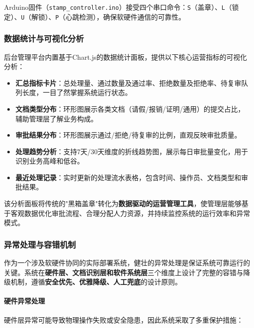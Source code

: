 \documentclass[conference]{IEEEtran}
\begin{document}
\noindent Arduino固件（\texttt{stamp\_controller.ino}）接受四个串口命令：\texttt{S}（盖章）、\texttt{L}（锁定）、\texttt{U}（解锁）、\texttt{P}（心跳检测），确保软硬件通信的可靠性。

\subsubsection{数据统计与可视化分析}

后台管理平台内置基于Chart.js的数据统计面板，提供以下核心运营指标的可视化分析：

\begin{itemize}[leftmargin=*]
    \item \textbf{汇总指标卡片}：总处理量、通过数量及通过率、拒绝数量及拒绝率、待复审队列长度，一目了然掌握系统运行状态。
    \item \textbf{文档类型分布}：环形图展示各类文档（请假/报销/证明/通用）的提交占比，辅助管理层了解业务构成。
    \item \textbf{审批结果分布}：环形图展示通过/拒绝/待复审的比例，直观反映审批质量。
    \item \textbf{处理趋势分析}：支持7天/30天维度的折线趋势图，展示每日审批量变化，用于识别业务高峰和低谷。
    \item \textbf{最近处理记录}：实时更新的处理流水表格，包含时间、操作员、文档类型和审批结果。
\end{itemize}

\noindent 该分析面板将传统的"黑箱盖章"转化为\textbf{数据驱动的运营管理工具}，使管理层能够基于客观数据优化审批流程、合理分配人力资源，并持续监控系统的运行效率和异常模式。

\subsubsection{异常处理与容错机制}

作为一个涉及软硬件协同的实际部署系统，健壮的异常处理是保证系统可靠运行的关键。系统在\textbf{硬件层、文档识别层和软件系统层}三个维度上设计了完整的容错与降级机制，遵循\textbf{安全优先、优雅降级、人工兜底}的设计原则。

\paragraph{硬件异常处理}

硬件层异常可能导致物理操作失败或安全隐患，因此系统采取了多重保护措施：
\end{document}
